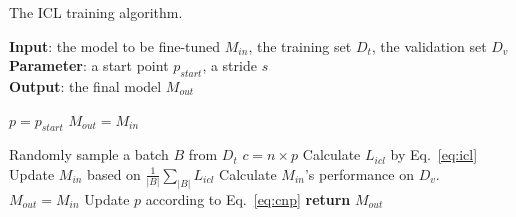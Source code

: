 \begin{algorithm}[th]
	\caption{The ICL training algorithm.}
	\label{alg:picl}
	\small
	\textbf{Input}: the model to be fine-tuned $M_{in}$, the training set $D_t$, the validation set $D_v$\\
	\textbf{Parameter}: a start point $p_{start}$, a stride $s$\\
	\textbf{Output}: the final model $M_{out}$
	\begin{algorithmic}[1] %
		\State $p = p_{start}$ 
		\State $M_{out}=M_{in}$ 
			
			\State {}
				\State Randomly sample a batch $B$ from $D_t$
					\State $c = n\times p$
					\State Calculate $L_{icl}$ by Eq.~\ref{eq:icl}
				\EndFor
				\State Update $M_{in}$ based on $\frac{1}{|B|}\sum_{|B|}L_{icl}$
			\EndFor
			\State {}
			\State Calculate $M_{in}$'s performance on $D_v$.
				\State $M_{out} = M_{in}$
			\Else
				\State Update $p$ according to Eq.~\ref{eq:cnp}
			\EndIf
		\EndFor	
		\State \textbf{return} $M_{out}$
	
		\EndProcedure
	\end{algorithmic}

\end{algorithm}

